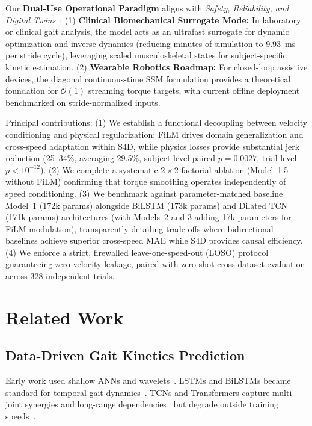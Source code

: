 \documentclass[journal]{IEEEtran}
\begin{document}
Our \textbf{Dual-Use Operational Paradigm} aligns with \emph{Safety, Reliability, and Digital Twins}~\cite{chakshu2024digital, sun2023digital}: (1) \textbf{Clinical Biomechanical Surrogate Mode:} In laboratory or clinical gait analysis, the model acts as an ultrafast surrogate for dynamic optimization and inverse dynamics (reducing minutes of simulation to 9.93~ms per stride cycle), leveraging scaled musculoskeletal states for subject-specific kinetic estimation. (2) \textbf{Wearable Robotics Roadmap:} For closed-loop assistive devices, the diagonal continuous-time SSM formulation provides a theoretical foundation for $\mathcal{O}(1)$ streaming torque targets, with current offline deployment benchmarked on stride-normalized inputs.

Principal contributions: (1) We establish a functional decoupling between velocity conditioning and physical regularization: FiLM drives domain generalization and cross-speed adaptation within S4D, while physics losses provide substantial jerk reduction (25--34\%, averaging 29.5\%, subject-level paired $p = 0.0027$, trial-level $p < 10^{-12}$). (2) We complete a systematic $2 \times 2$ factorial ablation (Model~1.5 without FiLM) confirming that torque smoothing operates independently of speed conditioning. (3) We benchmark against parameter-matched baseline Model~1 (172k params) alongside BiLSTM (173k params) and Dilated TCN (171k params) architectures (with Models~2 and 3 adding 17k parameters for FiLM modulation), transparently detailing trade-offs where bidirectional baselines achieve superior cross-speed MAE while S4D provides causal efficiency. (4) We enforce a strict, firewalled leave-one-speed-out (LOSO) protocol guaranteeing zero velocity leakage, paired with zero-shot cross-dataset evaluation across 328 independent trials.

\section{Related Work}

\subsection{Data-Driven Gait Kinetics Prediction}
Early work used shallow ANNs and wavelets~\cite{ardestani2014human}. LSTMs and BiLSTMs became standard for temporal gait dynamics~\cite{mundt2020prediction, johnson2021comparison}. TCNs and Transformers capture multi-joint synergies and long-range dependencies~\cite{molinaro2024estimating, sharifi2023biomat, hossain2023estimation} but degrade outside training speeds~\cite{camargo2021machine}.
\end{document}
